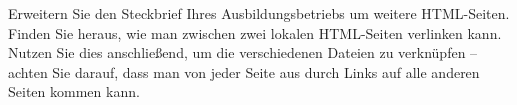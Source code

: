 \documentclass[11pt, a4paper, oneside]{article}
\begin{document}
	\lines[8cm]
	
	
	
	Erweitern Sie den Steckbrief Ihres Ausbildungsbetriebs um weitere HTML-Seiten.
	Finden Sie heraus, wie man zwischen zwei lokalen HTML-Seiten verlinken kann.
	Nutzen Sie dies anschließend, um die verschiedenen Dateien zu verknüpfen -- achten Sie darauf, dass man von jeder Seite aus durch Links auf alle anderen Seiten kommen kann.
\end{document}
